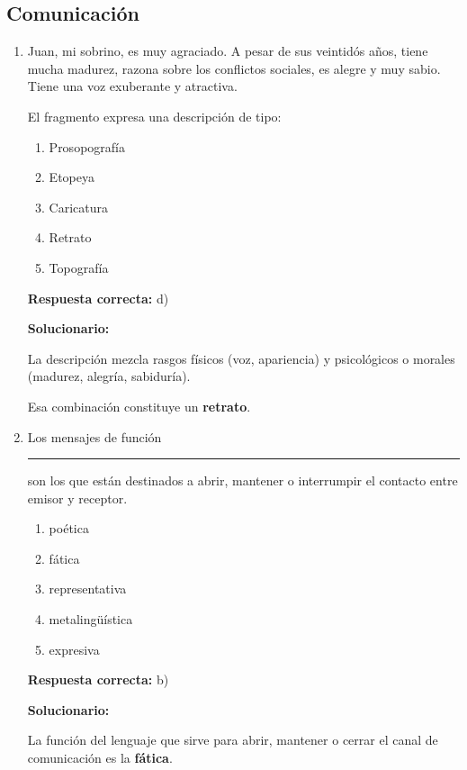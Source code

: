 \subsection*{Comunicación}

\begin{enumerate}[resume]

	
	\item Juan, mi sobrino, es muy agraciado. A pesar de sus veintidós años, tiene mucha madurez, razona sobre los conflictos sociales, es alegre y muy sabio. Tiene una voz exuberante y atractiva.
	
	El fragmento expresa una descripción de tipo:
	\begin{enumerate}[label=\alph*)]
		\item Prosopografía
		\item Etopeya
		\item Caricatura
		\item Retrato
		\item Topografía
	\end{enumerate}
	\textbf{Respuesta correcta:} d)
	
	\vspace{2mm}
	\textbf{Solucionario:}
	
	La descripción mezcla rasgos físicos (voz, apariencia) y psicológicos o morales (madurez, alegría, sabiduría).
	
	Esa combinación constituye un \textbf{retrato}.
	

	
	\vspace{6mm}
	
	\item Los mensajes de función \rule{2cm}{0.15mm} son los que están destinados a abrir, mantener o interrumpir el contacto entre emisor y receptor.
	\begin{enumerate}[label=\alph*)]
		\item poética
		\item fática
		\item representativa
		\item metalingüística
		\item expresiva
	\end{enumerate}
	\textbf{Respuesta correcta:} b)
	
	\vspace{2mm}
	\textbf{Solucionario:}
	
	La función del lenguaje que sirve para abrir, mantener o cerrar el canal de comunicación es la \textbf{fática}.
	


\end{enumerate}
